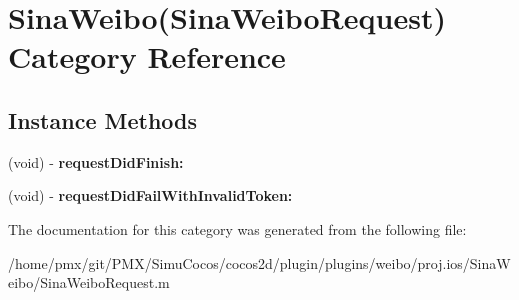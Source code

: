 \hypertarget{categorySinaWeibo_07SinaWeiboRequest_08}{}\section{Sina\+Weibo(Sina\+Weibo\+Request) Category Reference}
\label{categorySinaWeibo_07SinaWeiboRequest_08}
\subsection*{Instance Methods}
\begin{DoxyCompactItemize}
\item 
\mbox{\label{categorySinaWeibo_07SinaWeiboRequest_08_a8c55b28e74063526b363f5ed6f767d50}} 
(void) -\/ {\bfseries request\+Did\+Finish\+:}
\item 
\mbox{\label{categorySinaWeibo_07SinaWeiboRequest_08_af9528a97ec5cc610b9dc3d22fdad9d8f}} 
(void) -\/ {\bfseries request\+Did\+Fail\+With\+Invalid\+Token\+:}
\end{DoxyCompactItemize}


The documentation for this category was generated from the following file\+:\begin{DoxyCompactItemize}
\item 
/home/pmx/git/\+P\+M\+X/\+Simu\+Cocos/cocos2d/plugin/plugins/weibo/proj.\+ios/\+Sina\+Weibo/Sina\+Weibo\+Request.\+m\end{DoxyCompactItemize}
